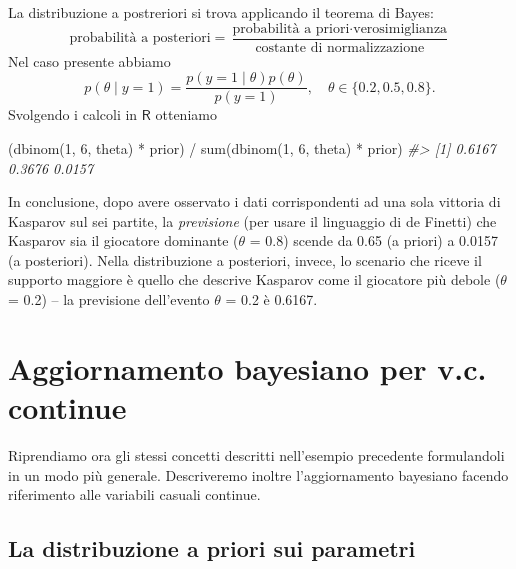 \documentclass[
  10pt,
  italian,
  a4paper,
  extrafontsizes,onecolumn,openright
  ]{memoir}
\newenvironment{Shaded}{\begin{snugshade}}{\end{snugshade}}
\newcommand{\CommentTok}[1]{\textcolor[rgb]{0.56,0.35,0.01}{\textit{#1}}}
\newcommand{\DecValTok}[1]{\textcolor[rgb]{0.00,0.00,0.81}{#1}}
\newcommand{\FunctionTok}[1]{\textcolor[rgb]{0.00,0.00,0.00}{#1}}
\newcommand{\NormalTok}[1]{#1}
\newcommand{\SpecialCharTok}[1]{\textcolor[rgb]{0.00,0.00,0.00}{#1}}
\begin{document}
La distribuzione a postreriori si trova applicando il teorema di Bayes:
\[
\text{probabilità a posteriori} = \frac{\text{probabilità a priori} \cdot \text{verosimiglianza}}{\text{costante di normalizzazione}}
\]
\noindent
Nel caso presente abbiamo
\[
p(\theta \mid y = 1) = \frac{p(y = 1 \mid \theta) p(\theta)}{p(y = 1)}, \quad \theta \in \{0.2, 0.5, 0.8\}.
\]
\noindent
Svolgendo i calcoli in \(\textsf{R}\) otteniamo

\begin{Shaded}
\begin{Highlighting}[]
\NormalTok{(}\FunctionTok{dbinom}\NormalTok{(}\DecValTok{1}\NormalTok{, }\DecValTok{6}\NormalTok{, theta) }\SpecialCharTok{*}\NormalTok{ prior) }\SpecialCharTok{/} \FunctionTok{sum}\NormalTok{(}\FunctionTok{dbinom}\NormalTok{(}\DecValTok{1}\NormalTok{, }\DecValTok{6}\NormalTok{, theta) }\SpecialCharTok{*}\NormalTok{ prior) }
\CommentTok{\#\textgreater{} [1] 0.6167 0.3676 0.0157}
\end{Highlighting}
\end{Shaded}

In conclusione, dopo avere osservato i dati corrispondenti ad una sola vittoria di Kasparov sul sei partite, la \emph{previsione} (per usare il linguaggio di de Finetti) che Kasparov sia il giocatore dominante (\(\theta\) = 0.8) scende da 0.65 (a priori) a 0.0157 (a posteriori). Nella distribuzione a posteriori, invece, lo scenario che riceve il supporto maggiore è quello che descrive Kasparov come il giocatore più debole (\(\theta\) = 0.2) -- la previsione dell'evento \(\theta\) = 0.2 è 0.6167.

\hypertarget{aggiornamento-bayesiano-per-v.c.-continue}{%
\section{Aggiornamento bayesiano per v.c. continue}\label{aggiornamento-bayesiano-per-v.c.-continue}}

Riprendiamo ora gli stessi concetti descritti nell'esempio precedente formulandoli in un modo più generale. Descriveremo inoltre l'aggiornamento bayesiano facendo riferimento alle variabili casuali continue.

\hypertarget{la-distribuzione-a-priori-sui-parametri}{%
\subsection{La distribuzione a priori sui parametri}\label{la-distribuzione-a-priori-sui-parametri}}
\end{document}
